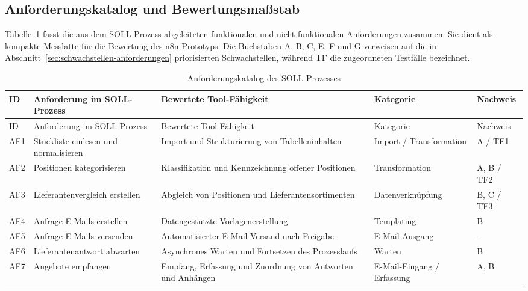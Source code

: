 \documentclass[a4paper,12pt]{article}
\newcommand{\LandscapePageNumbersOn}{%
    \pagestyle{empty}%
    \thispagestyle{empty}%
    \AddToShipoutPictureFG{%
        \AtPageLowerLeft{%
            \put(
                \LenToUnit{\dimexpr\paperwidth-12mm\relax},
                \LenToUnit{.5\paperheight}
            ){%
                \rotatebox{90}{\makebox[0pt][c]{\thepage}}%
            }%
        }%
    }%
}
\begin{document}
\clearpage
\begin{landscape}
\LandscapePageNumbersOn
\subsection{Anforderungskatalog und Bewertungsmaßstab}
\label{anhang:anforderungskatalog-soll}
Tabelle~\ref{tab:anforderungskatalog-soll} fasst die aus dem SOLL-Prozess abgeleiteten funktionalen und nicht-funktionalen Anforderungen zusammen. Sie dient als kompakte Messlatte für die Bewertung des n8n-Prototyps. Die Buchstaben A, B, C, E, F und G verweisen auf die in Abschnitt~\ref{sec:schwachstellen-anforderungen} priorisierten Schwachstellen, während TF die zugeordneten Testfälle bezeichnet.

\footnotesize
\setlength{\tabcolsep}{3pt}
\renewcommand{\arraystretch}{0.96}
\begin{longtable}{@{}>{\centering\arraybackslash}p{1.35cm}p{5.8cm}p{9.2cm}p{3.4cm}>{\centering\arraybackslash}p{3.0cm}@{}}
    \caption{Anforderungskatalog des SOLL-Prozesses}
    \label{tab:anforderungskatalog-soll}\\
    \toprule
    ID & Anforderung im SOLL-Prozess & Bewertete Tool-Fähigkeit & Kategorie & Nachweis \\
    \midrule
    \endfirsthead
    \toprule
    ID & Anforderung im SOLL-Prozess & Bewertete Tool-Fähigkeit & Kategorie & Nachweis \\
    \midrule
    \endhead
    AF1 & Stückliste einlesen und normalisieren & Import und Strukturierung von Tabelleninhalten & Import / Transformation & A / TF1 \\
    AF2 & Positionen kategorisieren & Klassifikation und Kennzeichnung offener Positionen & Transformation & A, B / TF2 \\
    AF3 & Lieferantenvergleich erstellen & Abgleich von Positionen und Lieferantensortimenten & Datenverknüpfung & B, C / TF3 \\
    AF4 & Anfrage-E-Mails erstellen & Datengestützte Vorlagenerstellung & Templating & B \\
    AF5 & Anfrage-E-Mails versenden & Automatisierter E-Mail-Versand nach Freigabe & E-Mail-Ausgang & -- \\
    AF6 & Lieferantenantwort abwarten & Asynchrones Warten und Fortsetzen des Prozesslaufs & Warten & B \\
    AF7 & Angebote empfangen & Empfang, Erfassung und Zuordnung von Antworten und Anhängen & E-Mail-Eingang / Erfassung & A, B \\

\end{longtable}
\end{landscape}
\end{document}
